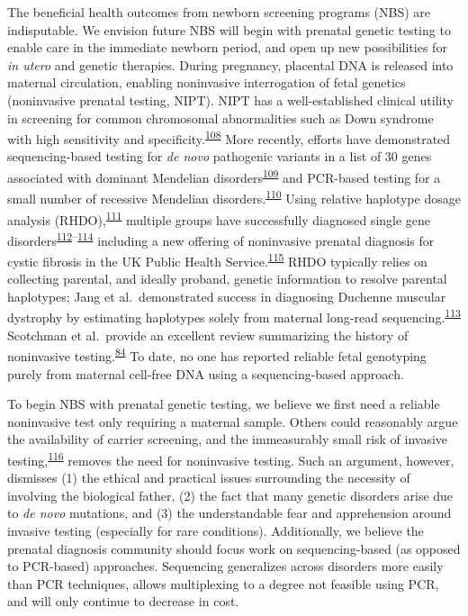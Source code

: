 \documentclass[11pt,letterpaper]{book}
\begin{document}
The beneficial health outcomes from newborn screening programs (NBS) are indisputable.
We envision future NBS will begin with prenatal genetic testing to enable care in the immediate newborn period, and open up new possibilities for \emph{in utero} and genetic therapies.
During pregnancy, placental DNA is released into maternal circulation, enabling noninvasive interrogation of fetal genetics (noninvasive prenatal testing, NIPT).
NIPT has a well-established clinical utility in screening for common chromosomal abnormalities such as Down syndrome with high sensitivity and specificity.\textsuperscript{\protect\hyperlink{ref-mackie:2017aa}{108}}
More recently, efforts have demonstrated sequencing-based testing for \emph{de novo} pathogenic variants in a list of 30 genes associated with dominant Mendelian disorders\textsuperscript{\protect\hyperlink{ref-zhang:2019aa}{109}} and PCR-based testing for a small number of recessive Mendelian disorders.\textsuperscript{\protect\hyperlink{ref-tsao:2019ab}{110}}
Using relative haplotype dosage analysis (RHDO),\textsuperscript{\protect\hyperlink{ref-lo:2010aa}{111}} multiple groups have successfully diagnosed single gene disorders\textsuperscript{\protect\hyperlink{ref-hui:2017aa}{112}--\protect\hyperlink{ref-vermeulen:2017aa}{114}} including a new offering of noninvasive prenatal diagnosis for cystic fibrosis in the UK Public Health Service.\textsuperscript{\protect\hyperlink{ref-chandler:2020aa}{115}}
RHDO typically relies on collecting parental, and ideally proband, genetic information to resolve parental haplotypes; Jang et al.~demonstrated success in diagnosing Duchenne muscular dystrophy by estimating haplotypes solely from maternal long-read sequencing.\textsuperscript{\protect\hyperlink{ref-jang:2018aa}{113}}
Scotchman et al.~provide an excellent review summarizing the history of noninvasive testing.\textsuperscript{\protect\hyperlink{ref-scotchman:2020aa}{84}}
To date, no one has reported reliable fetal genotyping purely from maternal cell-free DNA using a sequencing-based approach.

To begin NBS with prenatal genetic testing, we believe we first need a reliable noninvasive test only requiring a maternal sample.
Others could reasonably argue the availability of carrier screening, and the immeasurably small risk of invasive testing,\textsuperscript{\protect\hyperlink{ref-salomon:2019aa}{116}} removes the need for noninvasive testing.
Such an argument, however, dismisses (1) the ethical and practical issues surrounding the necessity of involving the biological father, (2) the fact that many genetic disorders arise due to \emph{de novo} mutations, and (3) the understandable fear and apprehension around invasive testing (especially for rare conditions).
Additionally, we believe the prenatal diagnosis community should focus work on sequencing-based (as opposed to PCR-based) approaches.
Sequencing generalizes across disorders more easily than PCR techniques, allows multiplexing to a degree not feasible using PCR, and will only continue to decrease in cost.
\end{document}
